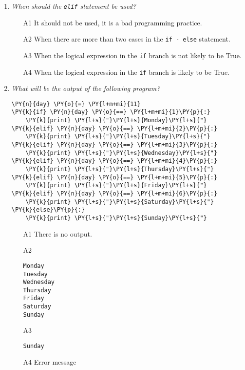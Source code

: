 \begin{enumerate}

\item {\em When should the {\tt elif} statement be used?}\\

\begin{enumerate}
\item[A1] It should not be used, it is a bad programming practice.
\item[A2] When there are more than two cases in the {\tt if - else} statement. 
\item[A3] When the logical expression in the {\tt if} branch is not likely to be True.
\item[A4] When the logical expression in the {\tt if} branch is likely to be True.
\end{enumerate}

\vspace{6mm}

\item {\em What will be the output of the following program?}\\

\begin{Verbatim}[commandchars=\\\{\}]
\PY{n}{day} \PY{o}{=} \PY{l+m+mi}{11}
\PY{k}{if} \PY{n}{day} \PY{o}{==} \PY{l+m+mi}{1}\PY{p}{:}
    \PY{k}{print} \PY{l+s}{"}\PY{l+s}{Monday}\PY{l+s}{"}
\PY{k}{elif} \PY{n}{day} \PY{o}{==} \PY{l+m+mi}{2}\PY{p}{:}
    \PY{k}{print} \PY{l+s}{"}\PY{l+s}{Tuesday}\PY{l+s}{"}
\PY{k}{elif} \PY{n}{day} \PY{o}{==} \PY{l+m+mi}{3}\PY{p}{:}
    \PY{k}{print} \PY{l+s}{"}\PY{l+s}{Wednesday}\PY{l+s}{"}
\PY{k}{elif} \PY{n}{day} \PY{o}{==} \PY{l+m+mi}{4}\PY{p}{:}
    \PY{k}{print} \PY{l+s}{"}\PY{l+s}{Thursday}\PY{l+s}{"}
\PY{k}{elif} \PY{n}{day} \PY{o}{==} \PY{l+m+mi}{5}\PY{p}{:}
    \PY{k}{print} \PY{l+s}{"}\PY{l+s}{Friday}\PY{l+s}{"}
\PY{k}{elif} \PY{n}{day} \PY{o}{==} \PY{l+m+mi}{6}\PY{p}{:}
    \PY{k}{print} \PY{l+s}{"}\PY{l+s}{Saturday}\PY{l+s}{"}
\PY{k}{else}\PY{p}{:}
    \PY{k}{print} \PY{l+s}{"}\PY{l+s}{Sunday}\PY{l+s}{"}
\end{Verbatim}
\vspace{6mm}


\begin{enumerate}
\item[A1] There is no output.
\item[A2] 
\begin{verbatim}
Monday
Tuesday
Wednesday
Thursday
Friday
Saturday
Sunday
\end{verbatim}
\item[A3] 
\begin{verbatim}
Sunday
\end{verbatim}
\item[A4] Error message
\begin{verbatim}
\end{verbatim}
\end{enumerate}


\end{enumerate}
